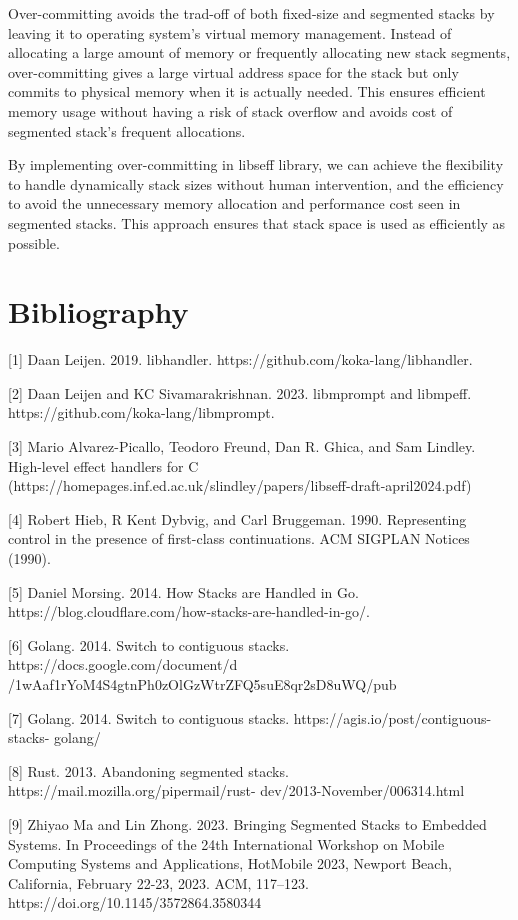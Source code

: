 \documentclass{article}
\begin{document}
Over-committing avoids the trad-off of both fixed-size and segmented stacks by leaving it to operating system's virtual memory management. Instead of allocating a large amount of memory or frequently allocating new stack segments, over-committing gives a large virtual address space for the stack but only commits to physical memory when it is actually needed. This ensures efficient memory usage without having a risk of stack overflow and avoids cost of segmented stack's frequent allocations.  

\medskip

By implementing over-committing in libseff library, we can achieve the flexibility to handle dynamically stack sizes without human intervention, and the efficiency to avoid the unnecessary memory allocation and performance cost seen in segmented stacks. This approach ensures that stack space is used as efficiently as possible.







\clearpage

\section{Bibliography}
[1] Daan Leijen. 2019. libhandler. https://github.com/koka-lang/libhandler.

[2] Daan Leijen and KC Sivamarakrishnan. 2023. libmprompt and libmpeff. https://github.com/koka-lang/libmprompt.

[3] Mario Alvarez-Picallo, Teodoro Freund, Dan R. Ghica, and Sam Lindley. High-level effect handlers for C (https://homepages.inf.ed.ac.uk/slindley/papers/libseff-draft-april2024.pdf)

[4] Robert Hieb, R Kent Dybvig, and Carl Bruggeman. 1990. Representing control in
the presence of first-class continuations. ACM SIGPLAN Notices (1990).

[5] Daniel Morsing. 2014. How Stacks are Handled in Go. https://blog.cloudflare.com/how-stacks-are-handled-in-go/.

[6] Golang. 2014. Switch to contiguous stacks. https://docs.google.com/document/d
/1wAaf1rYoM4S4gtnPh0zOlGzWtrZFQ5suE8qr2sD8uWQ/pub

[7] Golang. 2014. Switch to contiguous stacks. https://agis.io/post/contiguous-stacks-
golang/

[8] Rust. 2013. Abandoning segmented stacks. https://mail.mozilla.org/pipermail/rust-
dev/2013-November/006314.html

[9] Zhiyao Ma and Lin Zhong. 2023. Bringing Segmented Stacks to Embedded Systems. In Proceedings of the 24th
International Workshop on Mobile Computing Systems and Applications, HotMobile 2023, Newport Beach, California,
February 22-23, 2023. ACM, 117–123. https://doi.org/10.1145/3572864.3580344
\end{document}

